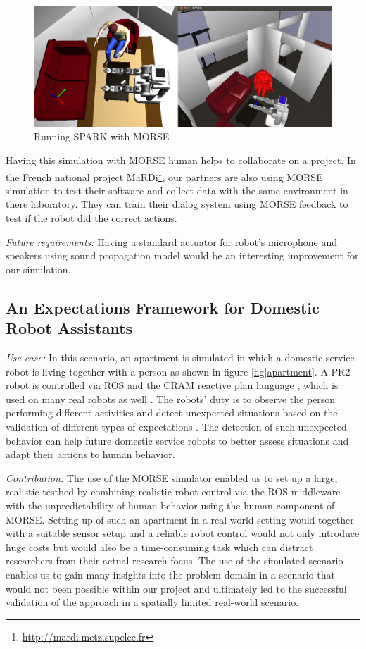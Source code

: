 \documentclass[conference]{IEEEtran}
\begin{document}
\begin{figure}[H]
      \centering
      \includegraphics[width=0.9\linewidth]{morsespark.png}
      \caption{Running SPARK with MORSE}
      \label{fig|spark}
\end{figure}

Having this simulation with MORSE human helps to collaborate on a project.
In the French national project MaRDi\footnote{\url{http://mardi.metz.supelec.fr}},
our partners are also using MORSE simulation to test their software and collect 
data with the same environment in there laboratory.
They can train their dialog system using MORSE feedback to test if the robot
did the correct actions.

\emph{Future requirements:}
Having a standard actuator for robot's microphone and speakers using sound
propagation model would be an interesting improvement for our simulation.

\subsection{An Expectations Framework for Domestic Robot Assistants}
\label{sc:expectations}

\emph{Use case:} In this scenario, an apartment is simulated in which a domestic 
service robot is living together with a person as shown in figure \ref{fig|apartment}. 
A PR2 robot is controlled via ROS and the CRAM reactive plan language \cite{beetz2010cram}, 
which is used on many real robots as well \cite{pancakes11humanoids}. The robots' 
duty is to observe the person performing different activities and detect unexpected 
situations based on the validation of different types of expectations \cite{Karg2013}. 
The detection of such unexpected behavior can help future domestic service robots 
to better assess situations and adapt their actions to human behavior. 

\emph{Contribution:} The use of the MORSE simulator enabled us to set up a large, 
realistic testbed by combining realistic robot control via the ROS middleware with the
unpredictability of human behavior using the human component of MORSE. Setting
up of such an apartment in a real-world setting would together with a suitable
sensor setup and a reliable robot control would not only introduce huge costs
but would also be a time-consuming task which can distract researchers from
their actual research focus. The use of the simulated scenario enables us to
gain many insights into the problem domain in a scenario that would not been
possible within our project and ultimately led to the successful validation of
the approach in a spatially limited real-world scenario.
\end{document}
